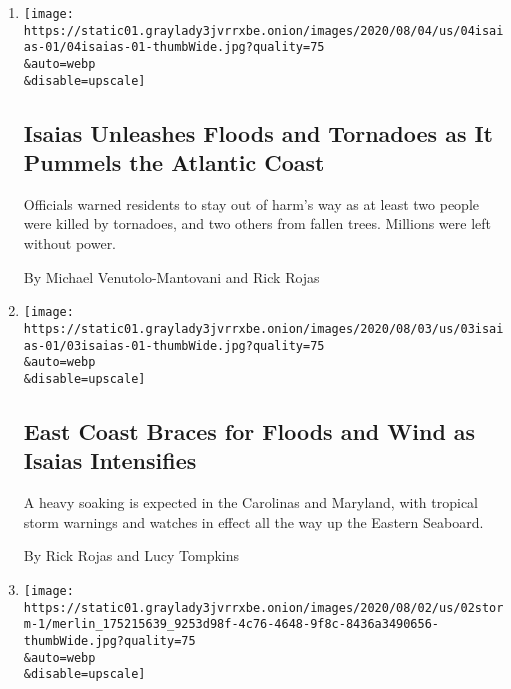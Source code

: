 \begin{enumerate}
\def\labelenumi{\arabic{enumi}.}
\item
  \href{/2020/08/04/us/hurricane-isaias-updates.html}{}

  \texttt{[image: https://static01.graylady3jvrrxbe.onion/images/2020/08/04/us/04isaias-01/04isaias-01-thumbWide.jpg?quality=75\\\&auto=webp\\\&disable=upscale]}

  \hypertarget{isaias-unleashes-floods-and-tornadoes-as-it-pummels-the-atlantic-coast}{%
  \subsection{Isaias Unleashes Floods and Tornadoes as It Pummels the
  Atlantic
  Coast}\label{isaias-unleashes-floods-and-tornadoes-as-it-pummels-the-atlantic-coast}}

  Officials warned residents to stay out of harm's way as at least two
  people were killed by tornadoes, and two others from fallen trees.
  Millions were left without power.

  By Michael Venutolo-Mantovani and Rick Rojas
\item
  \href{/2020/08/03/us/isaias-east-coast-landfall.html}{}

  \texttt{[image: https://static01.graylady3jvrrxbe.onion/images/2020/08/03/us/03isaias-01/03isaias-01-thumbWide.jpg?quality=75\\\&auto=webp\\\&disable=upscale]}

  \hypertarget{east-coast-braces-for-floods-and-wind-as-isaias-intensifies}{%
  \subsection{East Coast Braces for Floods and Wind as Isaias
  Intensifies}\label{east-coast-braces-for-floods-and-wind-as-isaias-intensifies}}

  A heavy soaking is expected in the Carolinas and Maryland, with
  tropical storm warnings and watches in effect all the way up the
  Eastern Seaboard.

  By Rick Rojas and Lucy Tompkins
\item
  \href{/2020/08/02/us/tropical-storm-isaias-florida-carolina.html}{}

  \texttt{[image: https://static01.graylady3jvrrxbe.onion/images/2020/08/02/us/02storm-1/merlin\_175215639\_9253d98f-4c76-4648-9f8c-8436a3490656-thumbWide.jpg?quality=75\\\&auto=webp\\\&disable=upscale]}

  \hypertarget{tropical-storm-isaias-grazing-florida-takes-aim-at-carolinas}{%
}
\end{enumerate}
